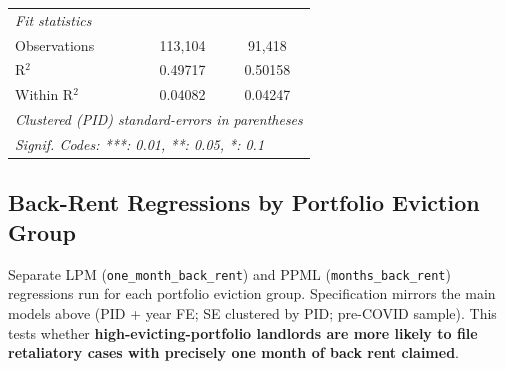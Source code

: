 \documentclass[
  11pt,
]{article}
\begin{document}
\begin{center}
{\begin{tabular}{lcc}
   \midrule
   \emph{Fit statistics}\\
   Observations                                                & 113,104       & 91,418\\  
   R$^2$                                                       & 0.49717       & 0.50158\\  
   Within R$^2$                                                & 0.04082       & 0.04247\\  
   \midrule \midrule
   \multicolumn{3}{l}{\emph{Clustered (PID) standard-errors in parentheses}}\\
   \multicolumn{3}{l}{\emph{Signif. Codes: ***: 0.01, **: 0.05, *: 0.1}}\\
\end{tabular}
}
\end{center}

\subsection{Back-Rent Regressions by Portfolio Eviction
Group}\label{back-rent-regressions-by-portfolio-eviction-group}

Separate LPM (\texttt{one\_month\_back\_rent}) and PPML
(\texttt{months\_back\_rent}) regressions run for each portfolio
eviction group. Specification mirrors the main models above (PID + year
FE; SE clustered by PID; pre-COVID sample). This tests whether
\textbf{high-evicting-portfolio landlords are more likely to file
retaliatory cases with precisely one month of back rent claimed}.
\end{document}
